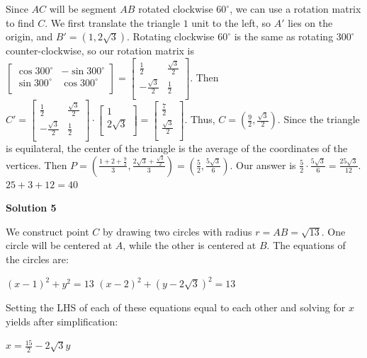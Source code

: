 \begin{enumerate}
Since $AC$ will be segment $AB$ rotated clockwise $60^{\circ}$, we can use a rotation matrix to find $C$. We first translate the triangle $1$ unit to the left, so $A'$ lies on the origin, and $B' = (1, 2\sqrt{3})$. Rotating clockwise $60^{\circ}$ is the same as rotating $300^{\circ}$ counter-clockwise, so our rotation matrix is $\begin{bmatrix} \cos{300^{\circ}} & -\sin{300^{\circ}}\\ \sin{300^{\circ}} & \cos{300^{\circ}}\\ \end{bmatrix} = \begin{bmatrix} \frac{1}{2} & \frac{\sqrt{3}}{2}\\ -\frac{\sqrt{3}}{2} & \frac{1}{2}\\ \end{bmatrix}$. Then $C' = \begin{bmatrix} \frac{1}{2} & \frac{\sqrt{3}}{2}\\ -\frac{\sqrt{3}}{2} & \frac{1}{2}\\ \end{bmatrix} \cdot \begin{bmatrix} 1\\ 2\sqrt{3}\\ \end{bmatrix} = \begin{bmatrix} \frac{7}{2}\\ \frac{\sqrt{3}}{2}\\ \end{bmatrix}$. Thus, $C = (\frac{9}{2}, \frac{\sqrt{3}}{2})$. Since the triangle is equilateral, the center of the triangle is the average of the coordinates of the vertices. Then $P = (\frac{1 + 2 + \frac{9}{2}}{3}, \frac{2\sqrt{3} + \frac{\sqrt{3}}{2}}{3}) = (\frac{5}{2}, \frac{5\sqrt{3}}{6})$. Our answer is $\frac{5}{2} \cdot \frac{5\sqrt{3}}{6} = \frac{25\sqrt{3}}{12}$. $25 + 3 + 12 = \boxed{40}$




\textbf{Solution 5}

We construct point $C$ by drawing two circles with radius $r = AB = \sqrt{13}$.  One circle will be centered at $A$, while the other is centered at $B$.  The equations of the circles are:

 $(x - 1)^2 + y^2 = 13$
$(x - 2)^2 + (y - 2\sqrt{3})^2 = 13$

 Setting the LHS of each of these equations equal to each other and solving for $x$ yields after simplification:

 $x = \frac{15}{2} - 2\sqrt{3}y$


\end{enumerate}
